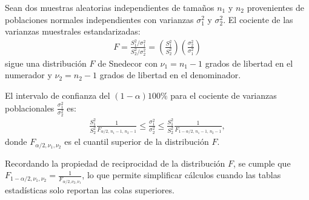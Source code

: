 \begin{teorema}
	Sean dos muestras aleatorias independientes de tamaños $n_1$ y $n_2$ provenientes de poblaciones normales independientes con varianzas $\sigma_1^2$ y $\sigma_2^2$. El cociente de las varianzas muestrales estandarizadas:
	\begin{align}
		F = \frac{S_1^2 / \sigma_1^2}{S_2^2 / \sigma_2^2} = \left(\frac{S_1^2}{S_2^2}\right)\left(\frac{\sigma_2^2}{\sigma_1^2}\right)
	\end{align}
	sigue una distribución $F$ de Snedecor con $\nu_1 = n_1 - 1$ grados de libertad en el numerador y $\nu_2 = n_2 - 1$ grados de libertad en el denominador.

	El intervalo de confianza del $(1-\alpha)100\%$ para el cociente de varianzas poblacionales $\frac{\sigma_1^2}{\sigma_2^2}$ es:
	\begin{align}
		\frac{S_1^2}{S_2^2} \frac{1}{F_{\alpha/2, \, n_1-1, \, n_2-1}} \leq \frac{\sigma_1^2}{\sigma_2^2} \leq \frac{S_1^2}{S_2^2} \frac{1}{F_{1-\alpha/2, \, n_1-1, \, n_2-1}},
	\end{align}
	donde $F_{\alpha/2, \nu_1, \nu_2}$ es el cuantil superior de la distribución $F$.

	Recordando la propiedad de reciprocidad de la distribución $F$, se cumple que $F_{1-\alpha/2, \nu_1, \nu_2} = \frac{1}{F_{\alpha/2, \nu_2, \nu_1}}$, lo que permite simplificar cálculos cuando las tablas estadísticas solo reportan las colas superiores.
\end{teorema}

